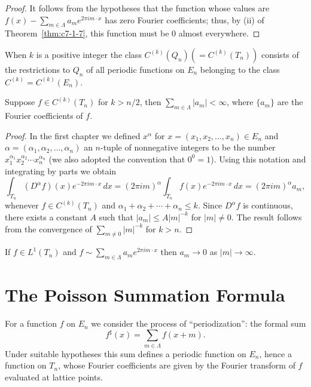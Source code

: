 \begin{proof}
It follows from the hypotheses that the function whose values are $f(x) - \sum_{m \in \Lambda} a_m e^{2\pi i m \cdot x}$ has zero Fourier coefficients; thus, by (ii) of Theorem~\ref{thm:c7-1-7}, this function must be $0$ almost everywhere.
\end{proof}

When $k$ is a positive integer the class $C^{(k)}(Q_n) (= C^{(k)}(T_n))$ consists of the restrictions to $Q_n$ of all periodic functions on $E_n$ belonging to the class $C^{(k)} = C^{(k)}(E_n)$.

\begin{corollary}\label{cor:c7-1-9}
Suppose $f \in C^{(k)}(T_n)$ for $k > n/2$, then $\sum_{m \in \Lambda} |a_m| < \infty$, where $\{a_m\}$ are the Fourier coefficients of $f$.
\end{corollary}

\begin{proof}
In the first chapter we defined $x^\alpha$ for $x = (x_1, x_2, \dots, x_n) \in E_n$ and $\alpha = (\alpha_1, \alpha_2, \dots, \alpha_n)$ an $n$-tuple of nonnegative integers to be the number $x_1^{\alpha_1} x_2^{\alpha_2} \cdots x_n^{\alpha_n}$ (we also adopted the convention that $0^0 = 1$). Using this notation and integrating by parts we obtain
\begin{equation}\label{eq:c7-1-10}
\int_{T_n} (D^\alpha f)(x) e^{-2\pi i m \cdot x}\,dx = (2\pi i m)^\alpha \int_{T_n} f(x) e^{-2\pi i m \cdot x}\,dx = (2\pi i m)^\alpha a_m,
\end{equation}
whenever $f \in C^{(k)}(T_n)$ and $\alpha_1 + \alpha_2 + \cdots + \alpha_n \leq k$. Since $D^\alpha f$ is continuous, there exists a constant $A$ such that $|a_m| \leq A |m|^{-k}$ for $|m| \neq 0$. The result follows from the convergence of $\sum_{m \neq 0} |m|^{-k}$ for $k > n$.
\end{proof}

\begin{corollary}\label{cor:c7-1-11}
If $f \in L^1(T_n)$ and $f \sim \sum_{m \in \Lambda} a_m e^{2\pi i m \cdot x}$ then $a_m \to 0$ as $|m| \to \infty$.
\end{corollary}

\section{The Poisson Summation Formula}

For a function $f$ on $E_n$ we consider the process of ``periodization'': the formal sum
\begin{equation}\label{eq:c7-2-1}
f^\sharp(x) = \sum_{m \in \Lambda} f(x + m).
\end{equation}
Under suitable hypotheses this sum defines a periodic function on $E_n$, hence a function on $T_n$, whose Fourier coefficients are given by the Fourier transform of $f$ evaluated at lattice points.

